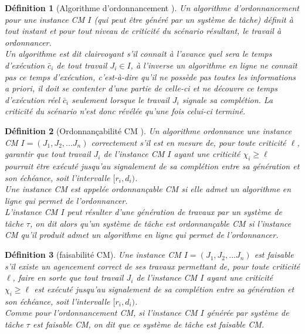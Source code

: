 \documentclass[a4paper]{report}
\theoremstyle{break}
\newtheorem{defin}{Définition}
\begin{document}
\begin{defin}[Algorithme d'ordonnancement \cite{baruah2010towards}]
Un algorithme d'ordonnancement pour une instance CM $I$ (qui peut être généré par un système de tâche) définit à tout instant et pour tout niveau de criticité du scénario résultant, le travail à ordonnancer.\\
Un algorithme est dit clairvoyant s'il connaît à l'avance quel sera le temps d'exécution $\bar{c}_i$ de tout travail $J_i \in I$, à l'inverse un algorithme en ligne ne connaît pas ce temps d'exécution, c'est-à-dire qu'il ne possède pas toutes les informations a priori, il doit se contenter d'une partie de celle-ci et ne découvre ce temps d'exécution réel $\bar{c}_i$ seulement lorsque le travail $J_i$ signale sa complétion. La criticité du scénario n'est donc révélée qu'une fois celui-ci terminé.
\end{defin}

\begin{defin}[Ordonnançabilité CM \cite{BaruahBDMSS11}]
Un algorithme ordonnance une instance CM $I = (J_1, J_2, ... J_n)$ correctement s'il est en mesure de, pour toute criticité $\ell$, garantir que tout travail $J_i$ de l'instance CM $I$ ayant une criticité $\chi_i \geq \ell$ pourrait être exécuté jusqu'au signalement de sa complétion entre sa génération et son échéance, soit l'intervalle $[r_i, d_i)$.\\ Une instance CM est appelée ordonnançable CM si elle admet un algorithme en ligne qui permet de l'ordonnancer.\\
L'instance CM $I$ peut résulter d'une génération de travaux par un système de tâche $\tau$, on dit alors qu'un système de tâche est ordonnançable CM si l'instance CM qu'il produit admet un algorithme en ligne qui permet de l'ordonnancer.
\end{defin}

\begin{defin}[faisabilité CM]
Une instance CM $I = (J_1, J_2, ... J_n)$ est faisable s'il existe un agencement correct de ses travaux permettant de, pour toute criticité $\ell$, faire en sorte que tout travail $J_i$ de l'instance CM $I$ ayant une criticité $\chi_i \geq \ell$ est exécuté jusqu'au signalement de sa complétion entre sa génération et son échéance, soit l'intervalle $[r_i, d_i)$.\\
Comme pour l'ordonnancement CM, si l'instance CM $I$ générée par système de tâche $\tau$ est faisable CM, on dit que ce système de tâche est faisable CM.
\end{defin}
\end{document}
